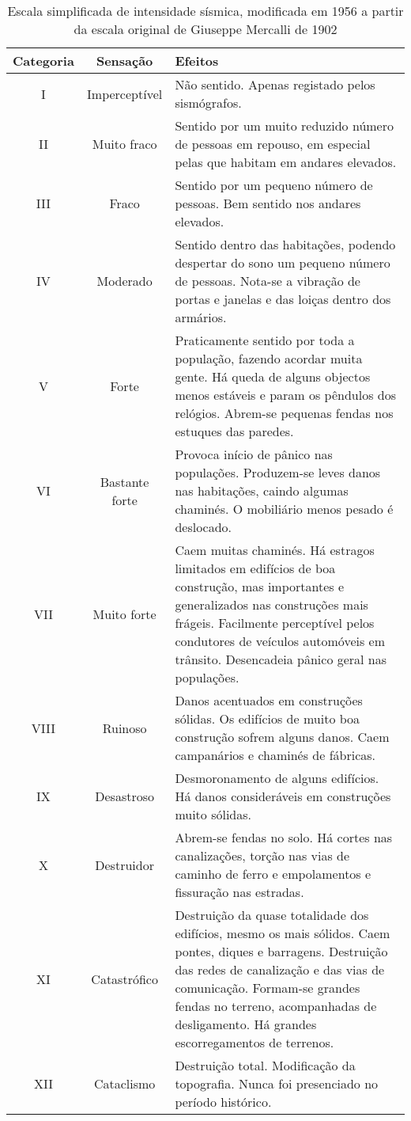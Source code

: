 \begin{table}[H]
\begin{center}
\begin{scriptsize}
\noindent\begin{tabular}{c|c|p{12cm}}
\hline
Categoria  	& Sensação & Efeitos \\
\hline
I 			&	Imperceptível 	&	Não sentido. Apenas registado pelos sismógrafos.
\\II 		&	Muito fraco 	&	Sentido por um muito reduzido número de pessoas em 
								repouso, em especial pelas que habitam em andares
								elevados.
\\III 		&	Fraco 			&	Sentido por um pequeno número de pessoas. Bem sentido nos andares elevados.
\\IV 		&	Moderado 		&	Sentido dentro das habitações, podendo despertar do sono um pequeno número de pessoas. 
								Nota-se a vibração de
								portas e janelas e das loiças dentro dos armários.
\\V 		&	Forte 			&	Praticamente sentido por toda a população, fazendo acordar muita gente. 
								Há queda de alguns objectos menos estáveis e param os pêndulos dos relógios. 
								Abrem-se pequenas fendas nos estuques das paredes.
\\VI 		&	Bastante forte 	&	Provoca início de pânico nas populações. Produzem-se leves danos nas habitações, 
								caindo algumas chaminés. O mobiliário menos pesado é deslocado.
\\VII 		&	Muito forte 	&	Caem muitas chaminés. Há estragos limitados em edifícios de boa construção, 
								mas importantes e generalizados nas construções mais frágeis. 
								Facilmente perceptível pelos condutores de veículos automóveis em trânsito. 
								Desencadeia pânico geral nas populações.
\\VIII 		&	Ruinoso  		&	Danos acentuados em construções sólidas. Os edifícios de muito boa construção 
								sofrem alguns danos. Caem campanários e chaminés de fábricas.
\\IX 		&	Desastroso 		&	Desmoronamento de alguns edifícios. Há danos consideráveis em construções muito sólidas.
\\X 		&	Destruidor 		&	Abrem-se fendas no solo. Há cortes nas canalizações, torção nas vias de caminho 
								de ferro e empolamentos e fissuração nas estradas.
\\XI 		&	Catastrófico 	&	Destruição da quase totalidade dos edifícios, mesmo os mais sólidos. 
								Caem pontes, diques e barragens. Destruição das redes de canalização e das vias de comunicação. 
								Formam-se grandes fendas no terreno, acompanhadas de desligamento. Há grandes escorregamentos de terrenos.
\\XII 		&	Cataclismo 		&	Destruição total. Modificação da topografia. Nunca foi presenciado no período histórico. \\
\hline
\end{tabular}
\caption{Escala simplificada de intensidade sísmica, modificada em 1956 a partir da escala original de Giuseppe Mercalli de 1902}
\label{tab:mercalli}
\end{scriptsize}
\end{center}
\end{table}
